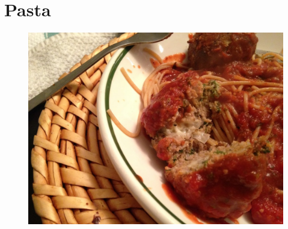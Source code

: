 \documentclass[11pt]{report}
\begin{document}
\chapter{Pasta}
\begin{figure}[h]
\begin{center}
   \includegraphics[width=\linewidth]{images/IMG_1095.JPG}
\end{center}
\end{figure}
\newpage










\end{document}

